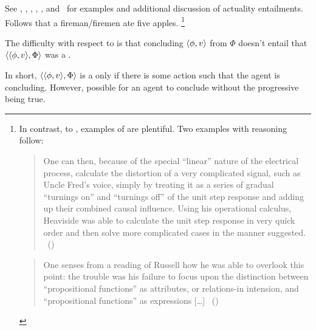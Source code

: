 \begin{note}
{    See \textcite{Asher:2012vr}, \textcite{Bhatt:2008aa}, \textcite{Hacquard:2006to,Hacquard:2009ta}, \textcite{Palmer:1977wb}, \textcite{Pinon:2003te}, and~\textcite{Werner:2011tp} for examples and additional discussion of actuality entailments.
  }
  Follows that a fireman/firemen ate five apples.%
  \footnote{
    In contrast, to \BoyPS{}, examples of \BoyPSC{} are plentiful.
    Two examples with reasoning follow:

    \begin{quote}
      One can then, because of the special ``linear'' nature of the electrical process, calculate the distortion of a very complicated signal, such as Uncle Fred's voice, simply by treating it as a series of gradual ``turnings on'' and ``turnings off'' of the unit step response and adding up their combined causal influence.
      Using his operational calculus, Heaviside was able to calculate the unit step response in very quick order and then solve more complicated cases in the manner suggested.%
      \mbox{ }\hfill\mbox{(\cite[316]{Wilson:1988wx})}
    \end{quote}

     \begin{quote}
       One senses from a reading of Russell how he was able to overlook this point:
       the trouble was his failure to focus upon the distinction between ``propositional functions'' as attributes, or relations-in intension, and ``propositional functions'' as expressions [\dots]%
      \mbox{ }\hfill\mbox{(\cite[152]{Quine:1967tv})}
    \end{quote}
  }



  The difficulty with respect to  is that concluding \(\langle\phi, v\rangle\) from \(\Phi\) doesn't entail that \(\langle \langle \phi, v \rangle, \Phi \rangle\) was a \fc{}.

  In short, \(\langle \langle \phi, v \rangle, \Phi \rangle\) is a \fc{} only if there is some action such that the agent is concluding.
  However, possible for an agent to conclude without the progressive being true.


\end{note}
